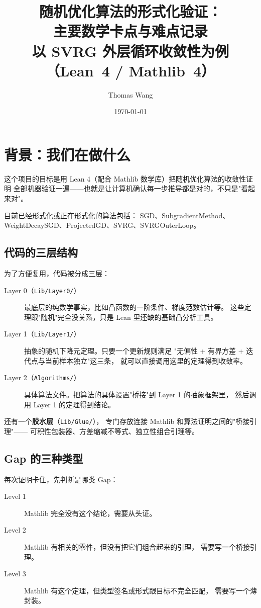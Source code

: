 \documentclass[11pt]{article}
\title{随机优化算法的形式化验证：\\
主要数学卡点与难点记录\\[0.5em]
\large 以 SVRG 外层循环收敛性为例（Lean~4 / Mathlib~4）}
\author{Thomas Wang}
\date{\today}
\theoremstyle{remark}
\begin{document}
\maketitle
\tableofcontents
\newpage

\section{背景：我们在做什么}

这个项目的目标是用 Lean 4（配合 Mathlib 数学库）把随机优化算法的收敛性证明
全部机器验证一遍——也就是让计算机确认每一步推导都是对的，不只是"看起来对"。

目前已经形式化或正在形式化的算法包括：
SGD、SubgradientMethod、WeightDecaySGD、ProjectedGD、SVRG、SVRGOuterLoop。

\subsection{代码的三层结构}

为了方便复用，代码被分成三层：

\begin{description}
  \item[Layer 0（\texttt{Lib/Layer0/}）]
    最底层的纯数学事实，比如凸函数的一阶条件、梯度范数估计等。
    这些定理跟"随机"完全没关系，只是 Lean 里还缺的基础凸分析工具。

  \item[Layer 1（\texttt{Lib/Layer1/}）]
    抽象的随机下降元定理。只要一个更新规则满足
    "无偏性 + 有界方差 + 迭代点与当前样本独立"这三条，
    就可以直接调用这里的定理得到收敛率。

  \item[Layer 2（\texttt{Algorithms/}）]
    具体算法文件。把算法的具体设置"桥接"到 Layer 1 的抽象框架里，
    然后调用 Layer 1 的定理得到结论。
\end{description}

还有一个\textbf{胶水层}（\texttt{Lib/Glue/}），
专门存放连接 Mathlib 和算法证明之间的"桥接引理"——
可积性包装器、方差缩减不等式、独立性组合引理等。

\subsection{Gap 的三种类型}

每次证明卡住，先判断是哪类 Gap：

\begin{description}
  \item[Level 1] Mathlib 完全没有这个结论，需要从头证。
  \item[Level 2] Mathlib 有相关的零件，但没有把它们组合起来的引理，
    需要写一个桥接引理。
  \item[Level 3] Mathlib 有这个定理，但类型签名或形式跟目标不完全匹配，
    需要写一个薄封装。
\end{description}
\end{document}
